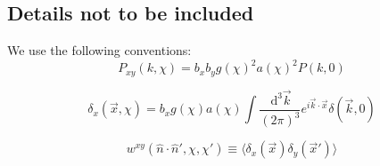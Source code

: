 \documentclass[twocolumn,prl,nofootinbib]{revtex4-1}
\newcommand{\ud}{\,\mathrm{d}}
\begin{document}







\begin{widetext}

\newpage

\section{Details not to be included}

We use the following conventions:
\begin{equation}
    P_{xy}(k, \chi) = b_x b_y g(\chi)^2 a(\chi)^2 P(k, 0)
\end{equation}

\begin{equation}
    \delta_x(\vec x, \chi) =  b_x g(\chi) a(\chi) \int\frac{\ud^3\vec k}{(2 \pi)^3}
        e^{i\vec k \cdot \vec x} \delta(\vec k, 0)
\end{equation}

\begin{equation}
    w^{xy}(\hat n \cdot \hat n', \chi, \chi')
    \equiv \langle \delta_x(\vec x) \delta_y(\vec x') \rangle
\end{equation}


\end{widetext}
\end{document}
